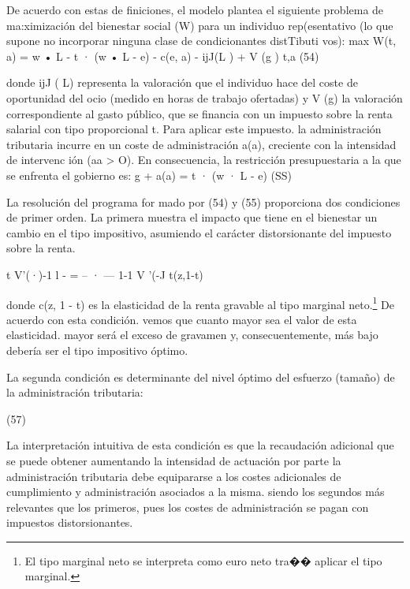 \documentclass[10pt,a4paper]{article}
\begin{document}
De acuerdo con estas de finiciones, el modelo plantea el siguiente problema de ma:ximización del bienestar social (W) para un individuo rep(esentativo (lo que supone no incorporar ninguna clase de condicionantes distTibuti vos):
max W(t, a) = w • L - t · (w • L - e) - c(e, a) - ijJ(L ) + V (g )
t,a
(54)

donde ijJ ( L) representa la valoración que el individuo hace del coste de oportunidad del ocio (medido en horas de trabajo ofertadas) y V (g) la valoración correspondiente al gasto público, que se financia con un impuesto sobre la renta salarial con tipo proporcional t. Para aplicar este impuesto. la administración tributaria incurre en un coste de administración a(a), creciente con la intensidad de intervenc ión (aa > O). En consecuencia, la restricción presupuestaria a la que se enfrenta el gobierno es:
g + a(a) = t · (w · L - e) (SS)

La resolución del programa for mado por (54) y (55) proporciona dos condiciones de primer orden. La primera muestra el impacto que tiene en el bienestar un cambio en el tipo impositivo, asumiendo el carácter distorsionante del impuesto sobre la renta.

t V'(·)-1 l - = -- · --- 1-1 V '(-J t(z,1-t)

donde c(z, 1 - t) es la elasticidad de la renta gravable al tipo marginal neto.\footnote{%
    El tipo marginal neto se interpreta como euro neto tra�� aplicar el tipo marginal.
} De acuerdo con esta condición. vemos que cuanto mayor sea el valor de esta elasticidad. mayor será el exceso de gravamen y, consecuentemente, más bajo debería ser el tipo impositivo óptimo.

La segunda condición es determinante del nivel óptimo del esfuerzo (tamaño) de la administración tributaria:

(57)

La interpretación intuitiva de esta condición es que la recaudación adicional que se puede obtener aumentando la intensidad de actuación por parte la administración tributaria debe equipararse a los costes adicionales de cumplimiento y administración asociados a la misma. siendo los segundos más relevantes que los primeros, pues los costes de administración se pagan con impuestos distorsionantes.
\end{document}
